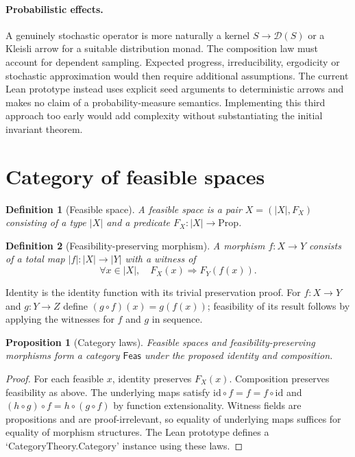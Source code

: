\documentclass[11pt,a4paper]{article}
\newtheorem{definition}{Definition}
\newtheorem{proposition}{Proposition}
\begin{document}
\paragraph{Probabilistic effects.}
A genuinely stochastic operator is more naturally a kernel
$S\to\mathcal{D}(S)$ or a Kleisli arrow for a suitable distribution
monad. The composition law must account for dependent sampling. Expected
progress, irreducibility, ergodicity or stochastic approximation would then
require additional assumptions. The current Lean prototype instead uses
explicit seed arguments to deterministic arrows and makes no claim of a
probability-measure semantics. Implementing this third approach too early
would add complexity without substantiating the initial invariant theorem.

\section{Category of feasible spaces}
\begin{definition}[Feasible space]
A feasible space is a pair $X=(|X|,F_X)$ consisting of a type $|X|$ and a
predicate $F_X:|X|\rightarrow\mathrm{Prop}$.
\end{definition}
\begin{definition}[Feasibility-preserving morphism]
A morphism $f:X\to Y$ consists of a total map
$|f|:|X|\to |Y|$ with a witness of
\begin{equation}
 \forall x\in |X|,\quad F_X(x)\Rightarrow F_Y(f(x)).
\end{equation}
\end{definition}

Identity is the identity function with its trivial preservation proof.
For $f:X\to Y$ and $g:Y\to Z$ define $(g\circ f)(x)=g(f(x))$;
feasibility of its result follows by applying the witnesses for $f$ and
$g$ in sequence.

\begin{proposition}[Category laws]
Feasible spaces and feasibility-preserving morphisms form a category
$\mathsf{Feas}$ under the proposed identity and composition.
\end{proposition}
\begin{proof}
For each feasible $x$, identity preserves $F_X(x)$. Composition preserves
feasibility as above. The underlying maps satisfy
$\mathrm{id}\circ f=f=f\circ\mathrm{id}$ and
$(h\circ g)\circ f=h\circ(g\circ f)$ by function extensionality.
Witness fields are propositions and are proof-irrelevant, so equality of
underlying maps suffices for equality of morphism structures. The Lean
prototype defines a `CategoryTheory.Category' instance using these laws.
\end{proof}
\end{document}
